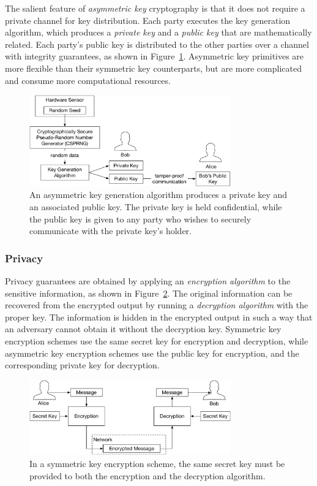 The salient feature of \textit{asymmetric key} cryptography is that it does not
require a private channel for key distribution. Each party executes the key
generation algorithm, which produces a \textit{private key} and a
\textit{public key} that are mathematically related. Each party's public key
is distributed to the other parties over a channel with integrity guarantees,
as shown in Figure~\ref{fig:asymmetric_key_generation}.
Asymmetric key primitives are more flexible than their symmetric key
counterparts, but are more complicated and consume more computational
resources.

\begin{figure}[hbt]
  \centering
  \includegraphics[width=87mm]{figures/asymmetric_key_generation.pdf}
  \caption{
    An asymmetric key generation algorithm produces a private key and an
    associated public key. The private key is held confidential, while the
    public key is given to any party who wishes to securely communicate with
    the private key's holder.
  }
  \label{fig:asymmetric_key_generation}
\end{figure}


\subsubsection{Privacy}

Privacy guarantees are obtained by applying an \textit{encryption algorithm} to
the sensitive information, as shown in Figure~\ref{fig:symmetric_encryption}.
The original information can be recovered from the encrypted output by running
a \textit{decryption algorithm} with the proper key. The information is hidden
in the encrypted output in such a way that an adversary cannot obtain it
without the decryption key. Symmetric key encryption schemes use the same
secret key for encryption and decryption, while asymmetric key encryption
schemes use the public key for encryption, and the corresponding private key
for decryption.

\begin{figure}[hbt]
  \centering
  \includegraphics[width=87mm]{figures/symmetric_encryption.pdf}
  \caption{
    In a symmetric key encryption scheme, the same secret key must be provided
    to both the encryption and the decryption algorithm.
  }
  \label{fig:symmetric_encryption}
\end{figure}

